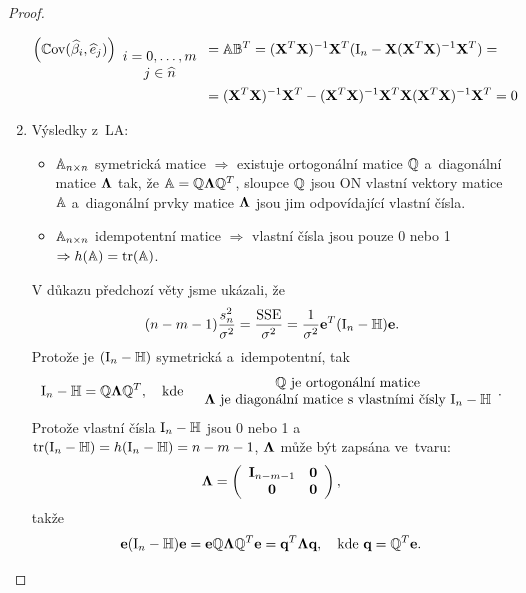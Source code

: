 \begin{proof}
\begin{enumerate}
 \begin{align*}
 \left(\mathbb{C}\mathrm{ov}(\widehat{\beta}_i, \widehat{e}_j) \right)_{ \begin{array}{c}
 i = 0,\dots, m \\
 j  \in\widehat{n}
 \end{array} } & = \mathbb{A} \mathbb{B}^T
 = (\mathbf{X}^T \mathbf{X})^{-1} \mathbf{X}^T (\text{I}_n - \mathbf{X} (\mathbf{X}^T \mathbf{X})^{-1} \mathbf{X}^T) = \\
& = (\mathbf{X}^T \mathbf{X})^{-1} \mathbf{X}^T - (\mathbf{X}^T \mathbf{X})^{-1} \mathbf{X}^T \mathbf{X} (\mathbf{X}^T \mathbf{X})^{-1} \mathbf{X}^T = 0
 \end{align*}
 
\item Výsledky z~LA:
\begin{itemize}
\item $\mathbb{A}_{n \times n}$ symetrická matice $\Rightarrow$ existuje ortogonální matice $\mathbb{Q}$ a~diagonální matice $\mathbf{\Lambda}$ tak, že $\mathbb{A} = \mathbb{Q} \mathbf{\Lambda} \mathbb{Q}^T$, sloupce $\mathbb{Q}$ jsou ON vlastní vektory matice $\mathbb{A}$ a~diagonální prvky matice $\mathbf{\Lambda}$ jsou jim odpovídající vlastní čísla.
\item $\mathbb{A}_{n \times n}$ idempotentní matice $\Rightarrow$ vlastní čísla jsou pouze 0 nebo 1 $\Rightarrow h(\mathbb{A}) = \mathrm{tr}(\mathbb{A})$.
\end{itemize}
V důkazu předchozí věty jsme ukázali, že
$$(n - m -1) \frac{s_n^2}{\sigma^2} = \frac{\mathrm{SSE}}{\sigma^2} = \frac{1}{\sigma^2} \mathbf{e}^T (\text{I}_n - \mathbb{H}) \mathbf{e}.$$
Protože je $(\text{I}_n - \mathbb{H})$ symetrická a~idempotentní, tak
 $$
 \text{I}_n - \mathbb{H} = \mathbb{Q} \mathbf{\Lambda} \mathbb{Q}^T,  \quad \text{kde} \quad
 \begin{array}{c}
 {\mathbb{Q}\text{ je ortogonální matice}} \\
{\mathbf{\Lambda}  \text{ je diagonální matice s~vlastními čísly } \text{I}_n - \mathbb{H}}
 \end{array}.
 $$
Protože vlastní čísla $\text{I}_n - \mathbb{H}$ jsou 0 nebo 1 a~$\mathrm{tr}(\text{I}_n - \mathbb{H}) = h(\text{I}_n - \mathbb{H}) = n - m - 1$, \linebreak
 $\mathbf{\Lambda}$ může být zapsána ve~tvaru:
 $$
 \mathbf{\Lambda} = 
 \left(\begin{array}{cc}
 \textbf{I}_{n-m-1} & \boldsymbol{0}  \\
 \boldsymbol{0} & \boldsymbol{0}
 \end{array} \right),
 $$
takže
 $$
 \mathbf{e} (\text{I}_n - \mathbb{H}) \mathbf{e} = \mathbf{e} \mathbb{Q} \mathbf{\Lambda} \mathbb{Q}^T \mathbf{e} = \textbf{q}^T \mathbf{\Lambda} \textbf{q}, \quad \text{kde } \textbf{q} = \mathbb{Q}^T \mathbf{e}.
 $$
 

\end{enumerate}
\end{proof}
